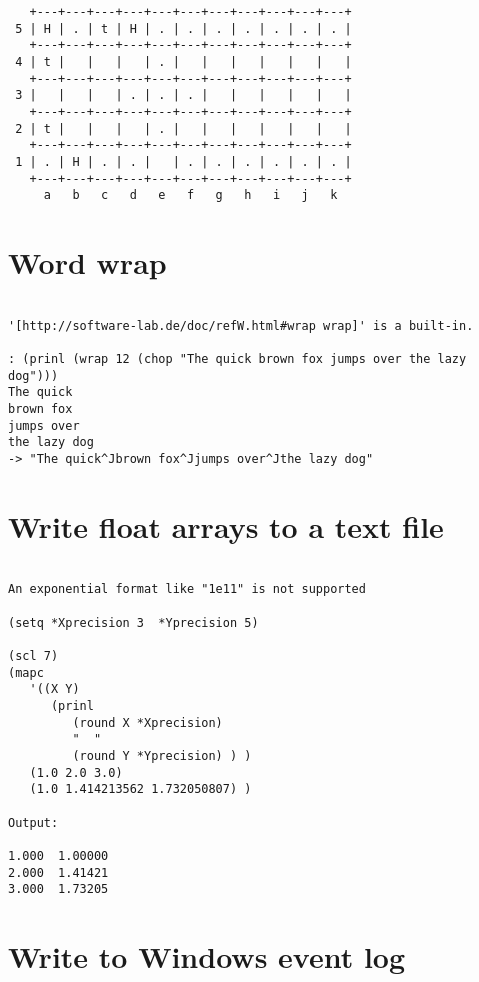 \begin{verbatim}
   +---+---+---+---+---+---+---+---+---+---+---+
 5 | H | . | t | H | . | . | . | . | . | . | . |
   +---+---+---+---+---+---+---+---+---+---+---+
 4 | t |   |   |   | . |   |   |   |   |   |   |
   +---+---+---+---+---+---+---+---+---+---+---+
 3 |   |   |   | . | . | . |   |   |   |   |   |
   +---+---+---+---+---+---+---+---+---+---+---+
 2 | t |   |   |   | . |   |   |   |   |   |   |
   +---+---+---+---+---+---+---+---+---+---+---+
 1 | . | H | . | . |   | . | . | . | . | . | . |
   +---+---+---+---+---+---+---+---+---+---+---+
     a   b   c   d   e   f   g   h   i   j   k

\end{verbatim}

\section*{Word wrap}

\begin{verbatim}

'[http://software-lab.de/doc/refW.html#wrap wrap]' is a built-in.

: (prinl (wrap 12 (chop "The quick brown fox jumps over the lazy dog")))
The quick
brown fox
jumps over
the lazy dog
-> "The quick^Jbrown fox^Jjumps over^Jthe lazy dog"

\end{verbatim}

\section*{Write float arrays to a text file}

\begin{verbatim}

An exponential format like "1e11" is not supported

(setq *Xprecision 3  *Yprecision 5)

(scl 7)
(mapc
   '((X Y)
      (prinl
         (round X *Xprecision)
         "  "
         (round Y *Yprecision) ) )
   (1.0 2.0 3.0)
   (1.0 1.414213562 1.732050807) )

Output:

1.000  1.00000
2.000  1.41421
3.000  1.73205

\end{verbatim}

\section*{Write to Windows event log}

